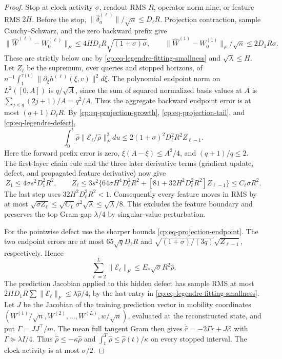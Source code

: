 \begin{proof}
Stop at clock activity $\sigma$, readout RMS $R$, operator norm nine,
or feature RMS $2H$.  Before the stop,
$\|\widehat\delta_a^{(\ell)}\|/\sqrt n\le D_\ell R$.
Projection contraction, sample Cauchy--Schwarz, and the zero backward
prefix give
\[
 \|\widehat W^{(\ell)}-W_0^{(\ell)}\|_F
 \le4HD_\ell R\sqrt{(1+\sigma)\sigma},\qquad
 \|\widehat W^{(1)}-W_0^{(1)}\|_F/\sqrt n\le2D_1R\sigma.
\]
These are strictly below one by
\eqref{cp:eq-legendre-fitting-smallness} and $\sqrt\lambda\le H$.
Let $Z_\ell$ be the supremum, over queries and stopped horizons, of
$n^{-1}\int_1^{\tau(t)}\|\partial_\xi h^{(\ell)}(\xi,v)\|^2d\xi$.
The polynomial endpoint norm on $L^2([0,A])$ is $q/\sqrt A$,
since the sum of squared normalized basis values at $A$ is
$\sum_{j<q}(2j+1)/A=q^2/A$. Thus the aggregate backward endpoint
error is at most $(q+1)D_\ell R$.  By
\eqref{cp:eq-projection-growth}, \eqref{cp:eq-projection-tail}, and
\eqref{cp:eq-legendre-defect},
\[
 \int_0^t\widehat\rho
       \|\mathcal E_\ell/\widehat\rho\|_F^2du
 \le2(1+\sigma)^2D_\ell^2R^2Z_{\ell-1}.
\]
Here the forward prefix error is zero,
$\xi(A-\xi)\le A^2/4$, and $(q+1)/q\le2$.
The first-layer chain rule and the three later derivative terms
(gradient update, defect, and propagated feature derivative) now give
\[
 Z_1\le4\sigma s^2D_1^2R^2,\qquad
 Z_\ell\le3s^2\{64\sigma H^4D_\ell^2R^2+
                 [81+32H^2D_\ell^2R^2]Z_{\ell-1}\}
          \le C_\ell\sigma R^2.
\]
The last step uses $32H^2D_\ell^2R^2<1$.
Consequently every feature moves in RMS by at most
$\sqrt{\sigma Z_\ell}\le\sqrt{C_L}\sigma^2\sqrt\lambda
\le\sqrt\lambda/8$.  This excludes the feature boundary and preserves
the top Gram gap $\lambda/4$ by singular-value perturbation.

For the pointwise defect use the sharper bounds
\eqref{cp:eq-projection-endpoint}.  The two endpoint errors are at most
$65\sqrt qD_\ell R$ and
$\sqrt{(1+\sigma)/(3q)}\sqrt{Z_{\ell-1}}$, respectively.  Hence
\begin{equation}
 \sum_{\ell=2}^L\|\mathcal E_\ell\|_F
          \le E_*\sqrt\sigma R^2\widehat\rho.
 \label{cp:eq-legendre-pointwise-defect}
\end{equation}
The prediction Jacobian applied to this hidden defect has sample RMS
at most $2HD_1R\sum\|\mathcal E_\ell\|_F
\le\lambda\widehat\rho/4$, by the last entry in
\eqref{cp:eq-legendre-fitting-smallness}. Let $J$ be the Jacobian of
the training prediction vector in mobility coordinates
$(W^{(1)}/\sqrt n,W^{(2)},\ldots,W^{(L)},w/\sqrt n)$, evaluated at
the reconstructed state, and put $\Gamma=JJ^\top/m$.
The mean full tangent Gram then gives
$\dot{\widehat r}=-2\Gamma\widehat r+J\mathcal E$ with
$\Gamma\succeq\lambda I/4$.  Thus
$\dot{\widehat\rho}\le-\kappa\widehat\rho$ and
$\int_t^T\widehat\rho\le\widehat\rho(t)/\kappa$ on every stopped
interval.  The clock activity is at most $\sigma/2$.


\end{proof}
